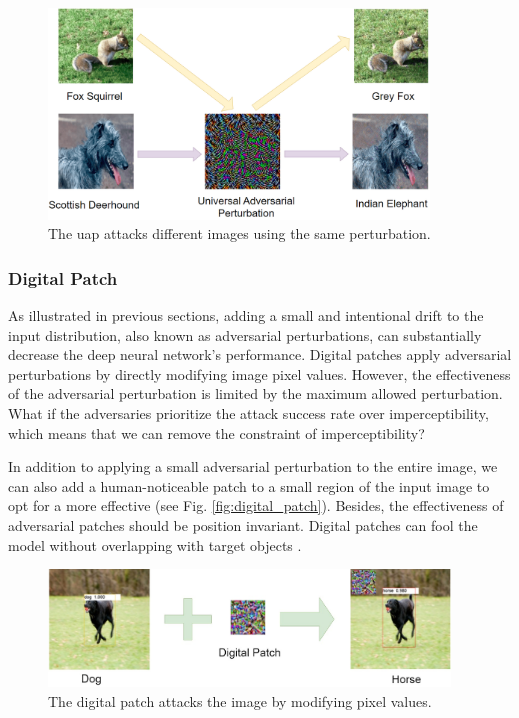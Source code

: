 \begin{figure}[H]
\centering
\includegraphics[width=0.9\textwidth]{figures/chapter_intro/uap.png}
\caption{The \acrfull{uap} attacks different images using the same perturbation.}
\label{fig.uap}
\end{figure}


\subsubsection{Digital Patch}

As illustrated in previous sections, adding a small and intentional drift to the input distribution, also known as adversarial perturbations, can substantially decrease the deep neural network's performance. Digital patches apply adversarial perturbations by directly modifying image pixel values. However, the effectiveness of the adversarial perturbation is limited by the maximum allowed perturbation. What if the adversaries prioritize the attack success rate over imperceptibility, which means that we can remove the constraint of imperceptibility?

In addition to applying a small adversarial perturbation to the entire image, we can also add a human-noticeable patch to a small region of the input image to opt for a more effective (see Fig. \ref{fig:digital_patch}). Besides, the effectiveness of adversarial patches should be position invariant. Digital patches can fool the model without overlapping with target objects \citep{saha2020role}.


\begin{figure}[H]
\centering
\includegraphics[width=0.95\textwidth]{figures/chapter_intro/digital_patch.jpg}
\caption{The digital patch attacks the image by modifying pixel values.}
\label{fig.digital_patch}
\end{figure}


